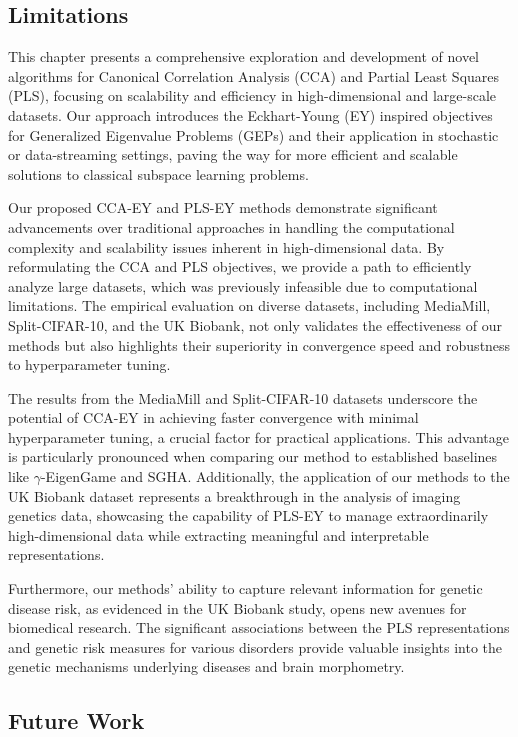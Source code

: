 \subsection{Limitations}

This chapter presents a comprehensive exploration and development of novel algorithms for Canonical Correlation Analysis (CCA) and Partial Least Squares (PLS), focusing on scalability and efficiency in high-dimensional and large-scale datasets.
Our approach introduces the Eckhart-Young (EY) inspired objectives for Generalized Eigenvalue Problems (GEPs) and their application in stochastic or data-streaming settings, paving the way for more efficient and scalable solutions to classical subspace learning problems.

Our proposed CCA-EY and PLS-EY methods demonstrate significant advancements over traditional approaches in handling the computational complexity and scalability issues inherent in high-dimensional data.
By reformulating the CCA and PLS objectives, we provide a path to efficiently analyze large datasets, which was previously infeasible due to computational limitations.
The empirical evaluation on diverse datasets, including MediaMill, Split-CIFAR-10, and the UK Biobank, not only validates the effectiveness of our methods but also highlights their superiority in convergence speed and robustness to hyperparameter tuning.

The results from the MediaMill and Split-CIFAR-10 datasets underscore the potential of CCA-EY in achieving faster convergence with minimal hyperparameter tuning, a crucial factor for practical applications.
This advantage is particularly pronounced when comparing our method to established baselines like $\gamma$-EigenGame and SGHA. Additionally, the application of our methods to the UK Biobank dataset represents a breakthrough in the analysis of imaging genetics data, showcasing the capability of PLS-EY to manage extraordinarily high-dimensional data while extracting meaningful and interpretable representations.

Furthermore, our methods' ability to capture relevant information for genetic disease risk, as evidenced in the UK Biobank study, opens new avenues for biomedical research.
The significant associations between the PLS representations and genetic risk measures for various disorders provide valuable insights into the genetic mechanisms underlying diseases and brain morphometry.

\subsection{Future Work}


